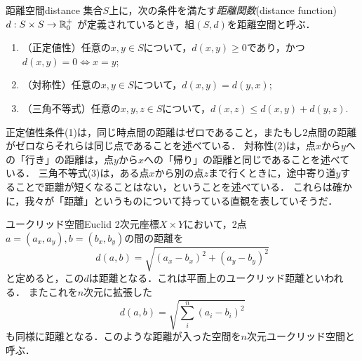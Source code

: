 \documentclass[11pt,a4paper, dvipdfmx]{jsarticle}
\begin{document}
\begin{dfn}{距離空間}{distance}
  集合$S$上に，次の条件を満たす\emph{距離関数}(distance function) $d:S \times S \to \mathbb{R}^+_0$ が定義されているとき，組$(S, d)$を距離空間と呼ぶ．
  \begin{enumerate}
    \item （正定値性）任意の$x,y \in S$について，$d(x, y) \geq 0$であり，かつ$d(x, y) = 0 \iff x=y$;
    \item （対称性）任意の$x,y \in S$について，$d(x, y) = d(y, x)$;
    \item （三角不等式）任意の$x, y, z \in S$について，$d(x, z) \leq d(x,y) + d(y,z)$.
  \end{enumerate}
\end{dfn}

正定値性条件(1)は，同じ時点間の距離はゼロであること，またもし2点間の距離がゼロならそれらは同じ点であることを述べている．
対称性(2)は，点$x$から$y$への「行き」の距離は，点$y$から$x$への「帰り」の距離と同じであることを述べている．
三角不等式(3)は，ある点$x$から別の点$z$まで行くときに，途中寄り道$y$することで距離が短くなることはない，ということを述べている．
これらは確かに，我々が「距離」というものについて持っている直観を表していそうだ．

\begin{rei}{ユークリッド空間}{Euclid}
  2次元座標$X \times Y$において，2点$a = (a_x, a_y), b=(b_x, b_y)$の間の距離を
  \[ d(a, b) = \sqrt{(a_x - b_x)^2 + (a_y - b_y)^2}\]
  と定めると，この$d$は距離となる．これは平面上のユークリッド距離といわれる．
  またこれを$n$次元に拡張した
  \[ d(a, b) = \sqrt{\sum_i^n(a_i - b_i)^2}\]
  も同様に距離となる．このような距離が入った空間を$n$次元ユークリッド空間と呼ぶ．
\end{rei}
\end{document}
